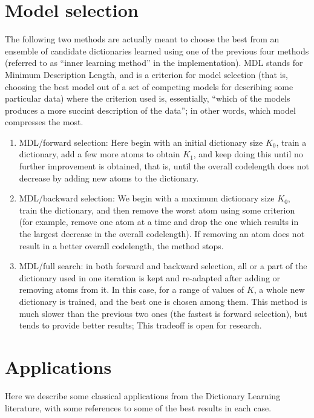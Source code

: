 \documentclass[a4paper]{IEEEtran}
\begin{document}
\section{Model selection}

The following two methods are actually meant to choose the best from an ensemble of candidate dictionaries learned using one of the previous four methods (referred to as ``inner learning method'' in the implementation). MDL stands for Minimum Description Length, and is a criterion for model selection (that is, choosing the best model out of a set of competing models for describing some particular data) where the criterion used is, essentially, ``which of the models produces a more succint description of the data''; in other words, which model compresses the most.
 
\begin{enumerate}
\item MDL/forward selection:  Here begin with an initial dictionary size $K_0$, train a dictionary, add a few more atoms to obtain $K_1$, and keep doing this until no further improvement is obtained, that is, until the overall codelength does not decrease by adding new atoms to the dictionary.
 
\item MDL/backward selection: We begin with a maximum dictionary size $K_0$, train the dictionary, and then remove the worst atom using some criterion (for example, remove one atom at a time and drop the one  which results in the largest decrease in the overall codelength). If removing an atom does not result in a better overall codelength, the method stops. 

\item MDL/full search: in both forward and backward selection, all or a part of the dictionary used in one iteration is kept and re-adapted after adding or removing atoms from it. In this case, for a range of values of $K$, a whole new dictionary is trained, and the best one is chosen among them. This method is much slower than the previous two ones (the fastest is forward selection), but tends to provide better results; This tradeoff is open for research.

\end{enumerate}


\section{Applications}

Here we describe some classical applications from the Dictionary Learning literature, with some references to some of the best results in each case.
\end{document}
